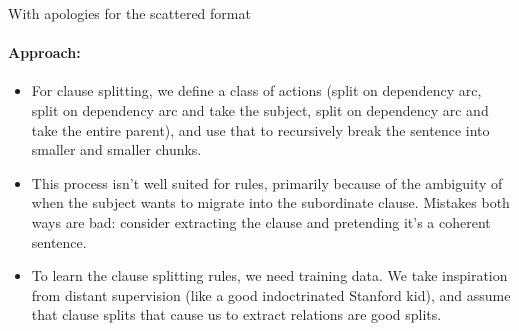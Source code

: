 With apologies for the scattered format

\paragraph{Approach:}
\begin{itemize}
%

  \item For clause splitting, we define a class of actions
    (split on dependency arc, split on dependency arc and take the subject,
    split on dependency arc and take the entire parent), and use that to
    recursively break the sentence into smaller and smaller chunks.
  
  \item This process isn't well suited for rules, primarily because of the
    ambiguity of when the subject wants to migrate into the subordinate
    clause. Mistakes both ways are bad: consider extracting the clause
     and pretending it's a coherent sentence.

  \item To learn the clause splitting rules, we need training data. 
    We take inspiration from distant supervision (like a good 
    indoctrinated Stanford kid), and assume that clause splits that cause
    us to extract relations are good splits.


\end{itemize}
